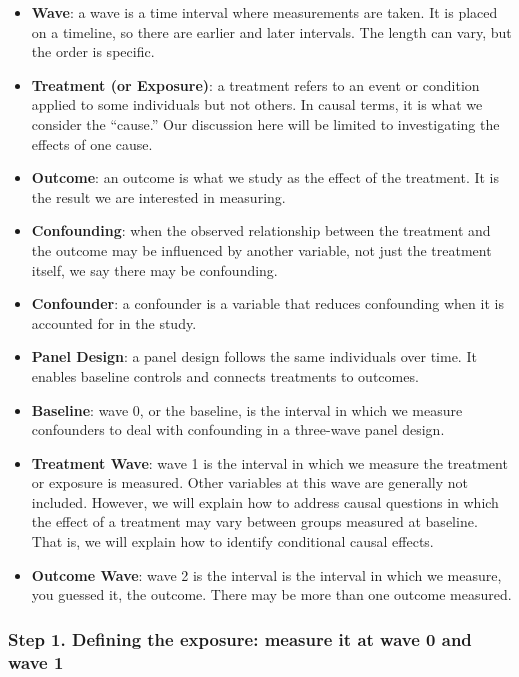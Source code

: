 \documentclass[
  singlecolumn]{article}
\begin{document}
\begin{itemize}
\item
  \textbf{Wave}: a wave is a time interval where measurements are taken.
  It is placed on a timeline, so there are earlier and later intervals.
  The length can vary, but the order is specific.
\item
  \textbf{Treatment (or Exposure)}: a treatment refers to an event or
  condition applied to some individuals but not others. In causal terms,
  it is what we consider the ``cause.'' Our discussion here will be
  limited to investigating the effects of one cause.
\item
  \textbf{Outcome}: an outcome is what we study as the effect of the
  treatment. It is the result we are interested in measuring.
\item
  \textbf{Confounding}: when the observed relationship between the
  treatment and the outcome may be influenced by another variable, not
  just the treatment itself, we say there may be confounding.
\item
  \textbf{Confounder}: a confounder is a variable that reduces
  confounding when it is accounted for in the study.
\item
  \textbf{Panel Design}: a panel design follows the same individuals
  over time. It enables baseline controls and connects treatments to
  outcomes.
\item
  \textbf{Baseline}: wave 0, or the baseline, is the interval in which
  we measure confounders to deal with confounding in a three-wave panel
  design.
\item
  \textbf{Treatment Wave}: wave 1 is the interval in which we measure
  the treatment or exposure is measured. Other variables at this wave
  are generally not included. However, we will explain how to address
  causal questions in which the effect of a treatment may vary between
  groups measured at baseline. That is, we will explain how to identify
  conditional causal effects.
\item
  \textbf{Outcome Wave}: wave 2 is the interval is the interval in which
  we measure, you guessed it, the outcome. There may be more than one
  outcome measured.
\end{itemize}

\subsubsection{Step 1. Defining the exposure: measure it at wave 0 and
wave
1}\label{step-1.-defining-the-exposure-measure-it-at-wave-0-and-wave-1}
\end{document}
